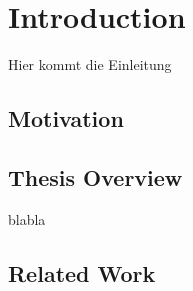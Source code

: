 \chapter{Introduction}
\label{sec:introduction}

Hier kommt die Einleitung
\section{Motivation}
\section{Thesis Overview}
blabla
\section{Related Work}